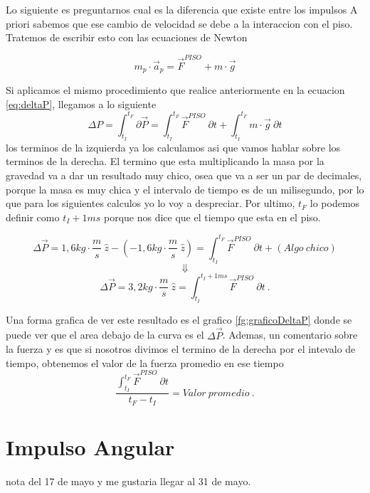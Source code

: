 \documentclass[../Main.tex]{subfiles}
\begin{document}
\begin{minipage}[t]{0.6\textwidth}

Lo siguiente es preguntarnos cual es la diferencia que existe entre los impulsos
A priori sabemos que ese cambio de velocidad se debe a la interaccion con el
piso. Tratemos de escribir esto con las ecuaciones de Newton

\begin{equation*}
    m_p \cdot \vec{a}_p = \vec{F} ^{PISO} + m \cdot \vec{g}
\end{equation*}

Si aplicamos el mismo procedimiento que realice anteriormente en la ecuacion
\ref{eq:deltaP}, llegamos a lo siguiente
\begin{equation*}
    \Delta P = \int _{t_I}^{t_F} \partial \vec{P} = \int _{t_I}^{t_F} \vec{F} ^{PISO} \ \partial t + \int _{t_I}^{t_F} m \cdot \vec{g} \ \partial t
\end{equation*}
los terminos de la izquierda ya los calculamos asi que vamos hablar sobre los
terminos de la derecha. El termino que esta multiplicando la masa por la
gravedad va a dar un resultado muy chico, osea que va a ser un par de decimales,
porque la masa es muy chica y el intervalo de tiempo es de un milisegundo, por
lo que para los siguientes calculos yo lo voy a despreciar. Por ultimo,
$t_F$ lo podemos definir como $t_I + 1ms$ porque nos dice que el tiempo que
esta en el piso.

\begin{equation*}
    \Delta \vec{P} = 1,6 kg \cdot \frac{m}{s} \ \hat{z} - \left( - 1,6 kg \cdot \frac{m}{s} \ \hat{z} \right) = \int _{t_I}^{t_F} \vec{F} ^{PISO} \ \partial t + (Algo \ chico)
\end{equation*}
\begin{equation*}
    \Downarrow
\end{equation*}
\begin{equation*}
    \Delta \vec{P} = 3,2 kg \cdot \frac{m}{s} \ \hat{z} = \int _{t_I}^{t_I + 1ms} \vec{F} ^{PISO} \ \partial t \ .
\end{equation*}

Una forma grafica de ver este resultado es el grafico \ref{fg:graficoDeltaP}
donde se puede ver que el area debajo de la curva es el $\Delta \vec{P}$.
Ademas, un comentario sobre la fuerza y es que si nosotros divimos el termino
de la derecha por el intevalo de tiempo, obtenemos el valor de la fuerza
promedio en ese tiempo
\begin{equation*}
    \frac{\int _{t_I}^{t_F} \vec{F} ^{PISO} \ \partial t}{t_F - t_I} = Valor \ promedio \ .
\end{equation*}

\end{minipage}
\newpage
\begin{minipage}[t]{0.3\textwidth}
\end{minipage}
\hfill
\begin{minipage}[t]{0.6\textwidth}
\section{Impulso Angular}
nota del 17 de mayo y me gustaria llegar al 31 de mayo.
\end{minipage}
\end{document}
